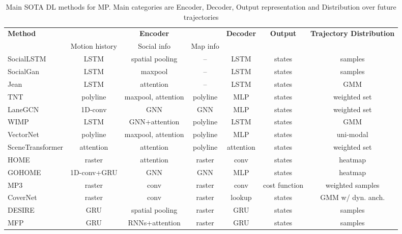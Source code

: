 \begin{table}[h!]
	\centering
	\captionsetup{justification=justified}
	\caption[Main \textit{state-of-the-art} Deep Learning methods for Motion Prediction]{Main \ac{SOTA} \ac{DL} methods for \ac{MP}. Main categories are Encoder, Decoder, Output representation and Distribution over future trajectories}
	\begin{adjustbox}{max width=\textwidth}
		\begin{tabular}{l |ccc|c|c|c}
			\toprule
			\textbf{Method}	&	& \textbf{Encoder}	&	& \textbf{Decoder}	& \textbf{Output}  & \textbf{Trajectory Distribution}	\\
			& Motion history	& Social info	& Map info	&	&	&	\\
			\midrule
			SocialLSTM \cite{alahi2016social}	& LSTM	& spatial pooling	& --	& LSTM	& states	& samples	\\
			SocialGan \cite{gupta2018social}	& LSTM	& maxpool	& --	& LSTM	& states	& samples	\\
			Jean \cite{mercat2020multi}	& LSTM	& attention	& --	& LSTM	& states	& GMM	\\
			TNT \cite{zhao2021tnt}	& polyline	& maxpool, attention	& polyline	& MLP	& states	& weighted set	\\
			LaneGCN \cite{liang2020learning}	& 1D-conv	& GNN	& GNN	& MLP	& states	& weighted set	\\
			WIMP \cite{khandelwal2020if}	& LSTM	& GNN+attention	& polyline	& LSTM	& states	& GMM	\\
			VectorNet \cite{gao2020vectornet}	& polyline	& maxpool, attention	& polyline	& MLP	& states	& uni-modal	\\
			SceneTransformer \cite{ngiam2022scene}	& attention	& attention	& polyline	& attention	& states	& weighted set	\\
			HOME \cite{gilles2021home}	& raster	& attention	& raster	& conv	& states	& heatmap	\\
			GOHOME \cite{gilles2022gohome}	& 1D-conv+GRU	& GNN	& GNN	& MLP	& states	& heatmap	\\
			MP3 \cite{casas2021mp3}	& raster	& conv	& raster	& conv	& cost function	& weighted samples	\\
			CoverNet \cite{phan2020covernet}	& raster	& conv	& raster	& lookup	& states	& GMM w/ dyn. anch.	\\
			DESIRE~\cite{lee2017desire}	& GRU	& spatial pooling	& raster	& GRU	& states	& samples	\\
			MFP \cite{tang2019multiple}	& GRU	& RNNs+attention	& raster	& GRU	& states	& samples	\\

\end{tabular}
\end{adjustbox}
\end{table}
